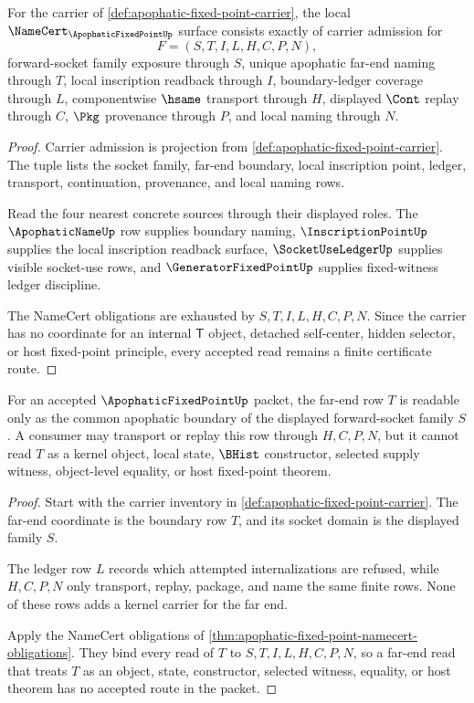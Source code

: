 \begin{theorem}
\label{thm:apophatic-fixed-point-namecert-obligations}
For the carrier of \autoref{def:apophatic-fixed-point-carrier}, the local $\NameCert_{\ApophaticFixedPointUp}$ surface consists exactly of carrier admission for
$$
F=(S,T,I,L,H,C,P,N),
$$
forward-socket family exposure through $S$, unique apophatic far-end naming through $T$, local inscription readback through $I$, boundary-ledger coverage through $L$, componentwise $\hsame$ transport through $H$, displayed $\Cont$ replay through $C$, $\Pkg$ provenance through $P$, and local naming through $N$.
\end{theorem}
\begin{proof}
Carrier admission is projection from \autoref{def:apophatic-fixed-point-carrier}. The tuple lists the socket family, far-end boundary, local inscription point, ledger, transport, continuation, provenance, and local naming rows.

Read the four nearest concrete sources through their displayed roles. The $\ApophaticNameUp$ row supplies boundary naming, $\InscriptionPointUp$ supplies the local inscription readback surface, $\SocketUseLedgerUp$ supplies visible socket-use rows, and $\GeneratorFixedPointUp$ supplies fixed-witness ledger discipline.

The NameCert obligations are exhausted by $S,T,I,L,H,C,P,N$. Since the carrier has no coordinate for an internal $\mathsf{T}$ object, detached self-center, hidden selector, or host fixed-point principle, every accepted read remains a finite certificate route.
\end{proof}

\begin{theorem}
\label{thm:apophatic-fixed-point-boundary-noninternalization}
For an accepted $\ApophaticFixedPointUp$ packet, the far-end row $T$ is readable only as the common apophatic boundary of the displayed forward-socket family $S$. A consumer may transport or replay this row through $H,C,P,N$, but it cannot read $T$ as a kernel object, local state, $\BHist$ constructor, selected supply witness, object-level equality, or host fixed-point theorem.
\end{theorem}
\begin{proof}
Start with the carrier inventory in \autoref{def:apophatic-fixed-point-carrier}. The far-end coordinate is the boundary row $T$, and its socket domain is the displayed family $S$.

The ledger row $L$ records which attempted internalizations are refused, while $H,C,P,N$ only transport, replay, package, and name the same finite rows. None of these rows adds a kernel carrier for the far end.

Apply the NameCert obligations of \autoref{thm:apophatic-fixed-point-namecert-obligations}. They bind every read of $T$ to $S,T,I,L,H,C,P,N$, so a far-end read that treats $T$ as an object, state, constructor, selected witness, equality, or host theorem has no accepted route in the packet.
\end{proof}

